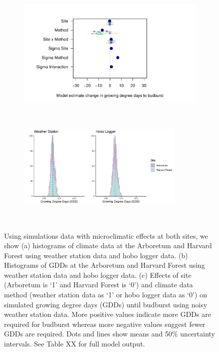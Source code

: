 \documentclass{article}\usepackage[]{graphicx}\usepackage[]{color}
\begin{document}
\begin{figure}
  \begin{subfigure}{.5\linewidth}
    \caption{}
      \centering
      \includegraphics[height=7cm, width=11cm]{..//analyses/figures/muplot_micros.pdf}
      \label{fig:muplotmicros}
  \end{subfigure}%
    \begin{subfigure}{.5\linewidth}
      \caption{}
      \centering
      \includegraphics[height=4cm, width=8cm]{..//analyses/figures/gdd_methods_micros.pdf}
    \label{fig:gddmicros}
  \end{subfigure}\\[1ex]
\caption{ Using simulations data with microclimatic effects at both sites, we show (a) histograms of climate data at the Arboretum and Harvard Forest using weather station data and hobo logger data. (b) Histograms of GDDs at the Arboretum and Harvard Forest using weather station data and hobo logger data. (c) Effects of site (Arboretum is `1' and Harvard Forest is `0') and climate data method (weather station data as `1' or hobo logger data as `0') on simulated growing degree days (GDDs) until budburst using noisy weather station data. More positive values indicate more GDDs are required for budburst whereas more negative values suggest fewer GDDs are required. Dots and lines show means and 50\% uncertainty intervals. See Table XX for full model output.}
\label{fig:micros}
\end{figure}
\end{document}
